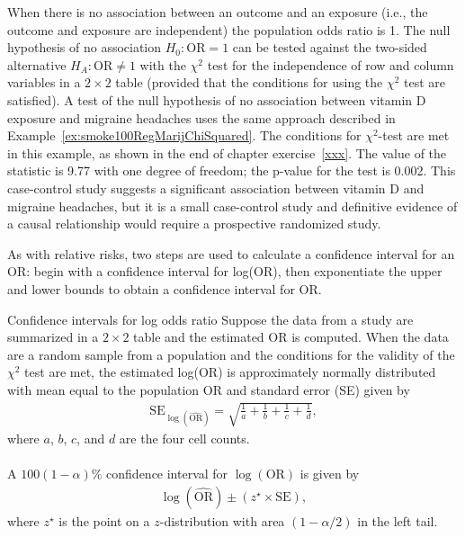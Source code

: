 

When there is no association between an outcome and an exposure (i.e., the outcome and exposure are independent) the population odds ratio is 1. The null hypothesis of no association $H_0:\text{OR} = 1$ can be tested against the two-sided alternative $H_A:\text{OR} \neq 1$ with the $\chi^2$ test for the independence of row and column variables in a $2 \times 2$ table (provided that the conditions for using the $\chi^2$ test are satisfied). A test of the null hypothesis of no association between vitamin D exposure and migraine  headaches uses the same approach described in Example~\ref{ex:smoke100RegMarijChiSquared}.  The conditions for $\chi^2$-test are met in this example, as shown in the end of chapter exercise~\ref{xxx}.  The value of the statistic is 9.77 with one degree of freedom; the p-value for the test is 0.002.  This case-control study suggests a significant association between vitamin D and migraine headaches, but it is a small case-control study and definitive evidence of a causal relationship would require a prospective randomized study.

As with relative risks, two steps are used to calculate a confidence interval for an OR: begin with a confidence interval for log(OR), then exponentiate the upper and lower bounds to obtain a confidence interval for OR.

\begin{onebox}{Confidence intervals for log odds ratio}
  Suppose the data from a study are summarized in a $2 \times 2$ table and the estimated OR is computed. When the data are a random sample from a population and the conditions for the validity of the $\chi^2$ test are met, the estimated log(OR) is approximately normally distributed with mean equal to the population OR and standard error (SE) given by
  \begin{align*}
    \text{SE}_{\log(\widehat{\text{OR}})} = \sqrt{\frac{1}{a} + \frac{1}{b}
   + \frac{1}{c} + \frac{1}{d}},
  \end{align*}
  where $a$, $b$, $c$, and $d$ are the four cell counts. \\
  \\
   A $100(1  - \alpha)\%$ confidence interval for $\log(\text{OR})$ is given by
\begin{align}
  \log(\widehat{\text{OR}}) \pm (z^{\star} \times \text{SE}),
  \label{eqn:confidenceIntervalOR}
\end{align}
where $z^{\star}$ is the point on a $z$-distribution with area $(1 - \alpha/2)$ in the left tail.
\end{onebox}

